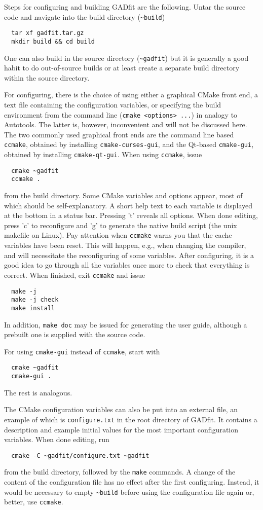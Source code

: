 \documentclass{article}
\begin{document}
Steps for configuring and building GADfit are the following. Untar the source code and navigate into the build directory (\verb+~build+)
\begin{verbatim}
  tar xf gadfit.tar.gz
  mkdir build && cd build
\end{verbatim}
One can also build in the source directory (\verb+~gadfit+) but it is generally a good habit to do out-of-source builds or at least create a separate build directory within the source directory.

For configuring, there is the choice of using either a graphical CMake front end, a text file containing the configuration variables, or specifying the build environment from the command line (\verb+cmake <options> ...+) in analogy to Autotools. The latter is, however, inconvenient and will not be discussed here. The two commonly used graphical front ends are the command line based \texttt{ccmake}, obtained by installing \texttt{cmake-curses-gui}, and the Qt-based \texttt{cmake-gui}, obtained by installing \texttt{cmake-qt-gui}. When using \texttt{ccmake}, issue
\begin{verbatim}
  cmake ~gadfit
  ccmake .
\end{verbatim}
from the build directory. Some CMake variables and options appear, most of which should be self-explanatory. A short help text to each variable is displayed at the bottom in a status bar. Pressing 't' reveals all options. When done editing, press 'c' to reconfigure and 'g' to generate the native build script (the unix makefile on Linux). Pay attention when \texttt{ccmake} warns you that the cache variables have been reset. This will happen, e.g., when changing the compiler, and will necessitate the reconfiguring of some variables. After configuring, it is a good idea to go through all the variables once more to check that everything is correct. When finished, exit \texttt{ccmake} and issue
\begin{verbatim}
  make -j
  make -j check
  make install
\end{verbatim}
In addition, \verb+make doc+ may be issued for generating the user guide, although a prebuilt one is supplied with the source code.

For using \texttt{cmake-gui} instead of \texttt{ccmake}, start with
\begin{verbatim}
  cmake ~gadfit
  cmake-gui .
\end{verbatim}
The rest is analogous.

The CMake configuration variables can also be put into an external file, an example of which is \texttt{configure.txt} in the root directory of GADfit. It contains a description and example initial values for the most important configuration variables. When done editing, run
\begin{verbatim}
  cmake -C ~gadfit/configure.txt ~gadfit
\end{verbatim}
from the build directory, followed by the \texttt{make} commands. A change of the content of the configuration file has no effect after the first configuring. Instead, it would be necessary to empty \verb+~build+ before using the configuration file again or, better, use \texttt{ccmake}.
\end{document}
